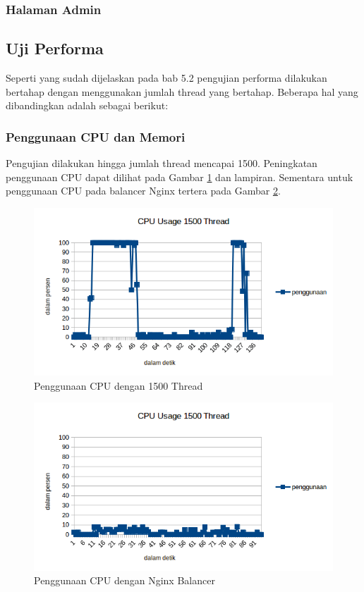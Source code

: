 \documentclass{ta-its}
\begin{document}
				\subsubsection{Halaman Admin}
			
			
			\subsection{Uji Performa}
				Seperti yang sudah dijelaskan pada bab 5.2 pengujian performa dilakukan bertahap dengan menggunakan jumlah thread yang bertahap. Beberapa hal yang dibandingkan adalah sebagai berikut:
				
				\subsubsection{Penggunaan CPU dan Memori}
					Pengujian dilakukan hingga jumlah thread mencapai 1500. Peningkatan penggunaan CPU dapat dilihat pada Gambar \ref{gambarUsage1500} dan lampiran. Sementara untuk penggunaan CPU pada balancer Nginx tertera pada Gambar \ref{gambarUsageNginx}.
					
					\begin{figure}[h] %
						\centering
						\includegraphics[width=\linewidth]{contoh_img/usage/1500}
						\caption{Penggunaan CPU dengan 1500 Thread}
						\label{gambarUsage1500}
					\end{figure}
					
					\begin{figure}[h] %
						\centering
						\includegraphics[width=\linewidth]{contoh_img/usage/nginx}
						\caption{Penggunaan CPU dengan Nginx Balancer}
						\label{gambarUsageNginx}
					\end{figure}
					
\end{document}
